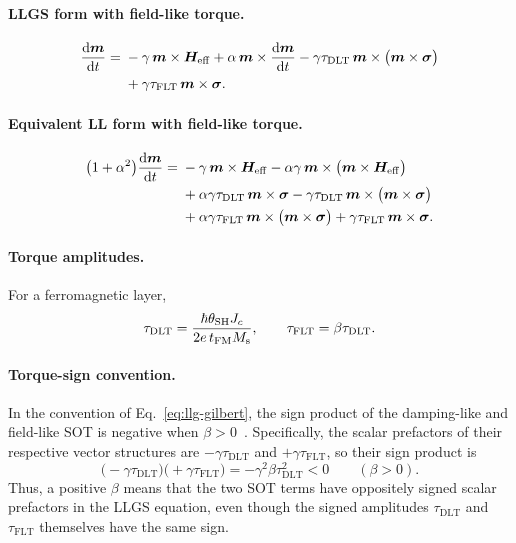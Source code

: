\paragraph{LLGS form with field-like torque.}
\begin{align}
    \frac{\mathop{}\!\mathrm{d}\bm{m}}{\mathop{}\!\mathrm{d} t}
    ={}& -\gamma\,\bm{m}\times\bm{H}_{\mathrm{eff}}
         + \alpha\,\bm{m}\times\frac{\mathop{}\!\mathrm{d}\bm{m}}{\mathop{}\!\mathrm{d} t}
         - \gamma\tau_{\mathrm{DLT}}\,
           \bm{m}\times\bigl(\bm{m}\times\bm{\sigma}\bigr)
         \notag\\
       & + \gamma\tau_{\mathrm{FLT}}\,
           \bm{m}\times\bm{\sigma}.
    \label{eq:llg-gilbert}
\end{align}

\paragraph{Equivalent LL form with field-like torque.}
\begin{align}
    \bigl(1+\alpha^2\bigr)\frac{\mathop{}\!\mathrm{d}\bm{m}}{\mathop{}\!\mathrm{d} t}
    ={}& -\gamma\,\bm{m}\times\bm{H}_{\mathrm{eff}}
         - \alpha\gamma\,\bm{m}\times\bigl(\bm{m}\times\bm{H}_{\mathrm{eff}}\bigr)
         \notag\\
       & + \alpha\gamma\tau_{\mathrm{DLT}}\,
           \bm{m}\times\bm{\sigma}
         - \gamma\tau_{\mathrm{DLT}}\,
           \bm{m}\times\bigl(\bm{m}\times\bm{\sigma}\bigr)
         \notag\\
       & + \alpha\gamma\tau_{\mathrm{FLT}}\,
           \bm{m}\times\bigl(\bm{m}\times\bm{\sigma}\bigr)
         + \gamma\tau_{\mathrm{FLT}}\,
           \bm{m}\times\bm{\sigma}.
    \label{eq:ll-with-flt}
\end{align}

\paragraph{Torque amplitudes.}
For a ferromagnetic layer,
\[
    \tau_{\mathrm{DLT}}
    = \frac{\hbar\theta_{\mathrm{SH}}J_c}
           {2e\,t_{\mathrm{FM}}M_{\mathrm{s}}},
    \qquad
    \tau_{\mathrm{FLT}}
    = \beta\tau_{\mathrm{DLT}}.
\]

\paragraph{Torque-sign convention.}
In the convention of Eq.~\eqref{eq:llg-gilbert}, the sign product of the
damping-like and field-like SOT is negative when
$\beta>0$~\cite{park2014macrospin}.  Specifically, the
scalar prefactors of their respective vector structures are
$-\gamma\tau_{\mathrm{DLT}}$ and $+\gamma\tau_{\mathrm{FLT}}$, so their sign
product is
\[
    \bigl(-\gamma\tau_{\mathrm{DLT}}\bigr)
    \bigl(+\gamma\tau_{\mathrm{FLT}}\bigr)
    = -\gamma^2\beta\tau_{\mathrm{DLT}}^2 < 0
    \qquad (\beta>0).
\]
Thus, a positive $\beta$ means that the two SOT terms have oppositely signed
scalar prefactors in the LLGS equation, even though the signed amplitudes
$\tau_{\mathrm{DLT}}$ and $\tau_{\mathrm{FLT}}$ themselves have the same sign.

